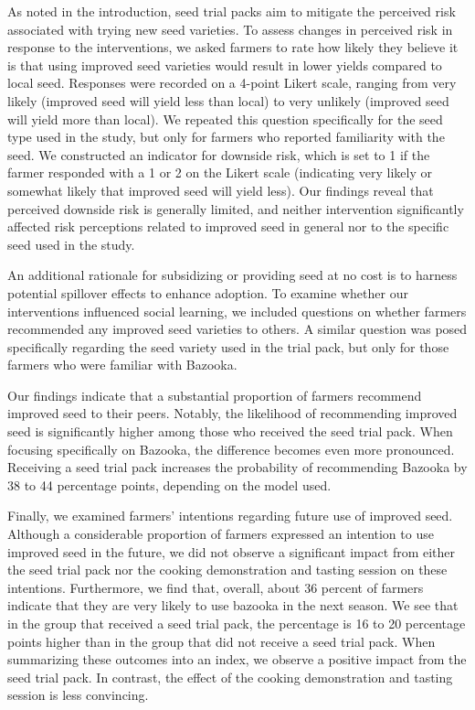 \documentclass[english]{article}\usepackage[]{graphicx}\usepackage[]{xcolor}
\begin{document}
As noted in the introduction, seed trial packs aim to mitigate the
perceived risk associated with trying new seed varieties. To assess
changes in perceived risk in response to the interventions, we asked
farmers to rate how likely they believe it is that using improved
seed varieties would result in lower yields compared to local seed.
Responses were recorded on a 4-point Likert scale, ranging from \textquotedbl very
likely\textquotedbl{} (improved seed will yield less than local) to
\textquotedbl very unlikely\textquotedbl{} (improved seed will yield
more than local). We repeated this question specifically for the seed
type used in the study, but only for farmers who reported familiarity
with the seed. We constructed an indicator for downside risk, which
is set to 1 if the farmer responded with a 1 or 2 on the Likert scale
(indicating \textquotedbl very likely\textquotedbl{} or \textquotedbl somewhat
likely\textquotedbl{} that improved seed will yield less). Our findings
reveal that perceived downside risk is generally limited, and neither
intervention significantly affected risk perceptions related to improved
seed in general nor to the specific seed used in the study.

An additional rationale for subsidizing or providing seed at no cost
is to harness potential spillover effects to enhance adoption. To
examine whether our interventions influenced social learning, we included
questions on whether farmers recommended any improved seed varieties
to others. A similar question was posed specifically regarding the
seed variety used in the trial pack, but only for those farmers who
were familiar with Bazooka.

Our findings indicate that a substantial proportion of farmers recommend
improved seed to their peers. Notably, the likelihood of recommending
improved seed is significantly higher among those who received the
seed trial pack. When focusing specifically on Bazooka, the difference
becomes even more pronounced. Receiving a seed trial pack increases
the probability of recommending Bazooka by 38 to 44 percentage points,
depending on the model used.

Finally, we examined farmers' intentions regarding future use of improved
seed. Although a considerable proportion of farmers expressed an intention
to use improved seed in the future, we did not observe a significant
impact from either the seed trial pack nor the cooking demonstration
and tasting session on these intentions. Furthermore, we find that,
overall, about 36 
percent of farmers indicate that they are very likely to use bazooka
in the next season. We see that in the group that received a seed
trial pack, the percentage is 16
to 20 percentage
points higher than in the group that did not receive a seed trial
pack. When summarizing these outcomes into an index, we observe a
positive impact from the seed trial pack. In contrast, the effect
of the cooking demonstration and tasting session is less convincing.
\end{document}
